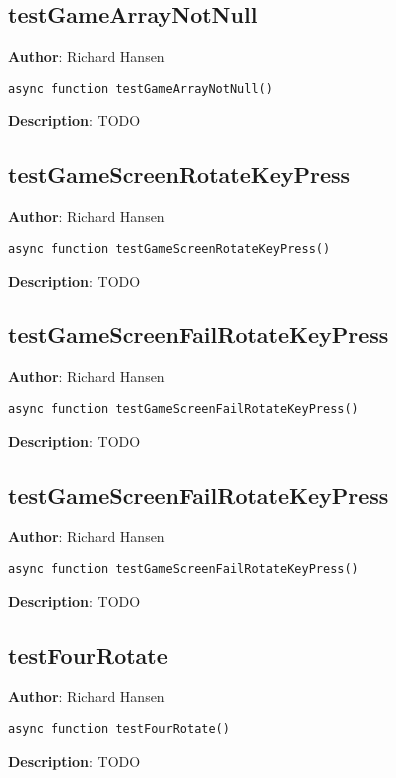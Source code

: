 \documentclass[12pt]{article}
\begin{document}
\subsection{testGameArrayNotNull}
\textbf{Author}: Richard Hansen 
\vspace*{1\baselineskip}
\begin{lstlisting}
async function testGameArrayNotNull()
\end{lstlisting} 
\vspace*{1\baselineskip}
\textbf{Description}: TODO 



\subsection{testGameScreenRotateKeyPress}
\textbf{Author}: Richard Hansen 
\vspace*{1\baselineskip}
\begin{lstlisting}
async function testGameScreenRotateKeyPress()
\end{lstlisting} 
\vspace*{1\baselineskip}
\textbf{Description}: TODO 



\subsection{testGameScreenFailRotateKeyPress}
\textbf{Author}: Richard Hansen 
\vspace*{1\baselineskip}
\begin{lstlisting}
async function testGameScreenFailRotateKeyPress()
\end{lstlisting} 
\vspace*{1\baselineskip}
\textbf{Description}: TODO 



\subsection{testGameScreenFailRotateKeyPress}
\textbf{Author}: Richard Hansen 
\vspace*{1\baselineskip}
\begin{lstlisting}
async function testGameScreenFailRotateKeyPress()
\end{lstlisting} 
\vspace*{1\baselineskip}
\textbf{Description}: TODO 



\subsection{testFourRotate}
\textbf{Author}: Richard Hansen 
\vspace*{1\baselineskip}
\begin{lstlisting}
async function testFourRotate()
\end{lstlisting} 
\vspace*{1\baselineskip}
\textbf{Description}: TODO 
\end{document}
